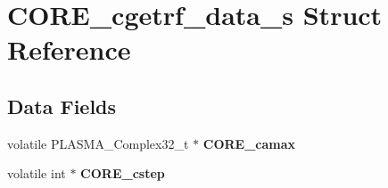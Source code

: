 \hypertarget{structCORE__cgetrf__data__s}{}\section{C\+O\+R\+E\+\_\+cgetrf\+\_\+data\+\_\+s Struct Reference}
\label{structCORE__cgetrf__data__s}
\subsection*{Data Fields}
\begin{DoxyCompactItemize}
\item 
\hypertarget{structCORE__cgetrf__data__s_aabe7c42d4dfd2af3251b79ec8b0580e0}{}volatile P\+L\+A\+S\+M\+A\+\_\+\+Complex32\+\_\+t $\ast$ {\bfseries C\+O\+R\+E\+\_\+camax}\label{structCORE__cgetrf__data__s_aabe7c42d4dfd2af3251b79ec8b0580e0}

\item 
\hypertarget{structCORE__cgetrf__data__s_a80fd89881bb50ca76b03f341677a1a6c}{}volatile int $\ast$ {\bfseries C\+O\+R\+E\+\_\+cstep}\label{structCORE__cgetrf__data__s_a80fd89881bb50ca76b03f341677a1a6c}

\end{DoxyCompactItemize}
